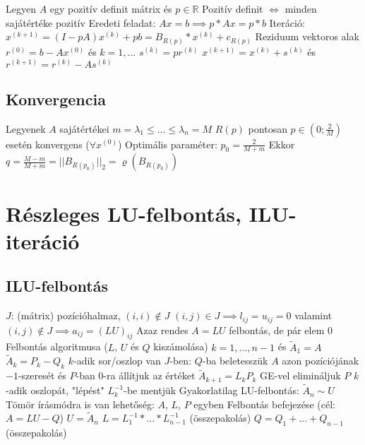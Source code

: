 \documentclass[12pt,a4paper]{article}
\begin{document}
\begin{outline}
	\1 Legyen $A$ egy pozitív definit mátrix és $p \in \mathbb{R}$
		\2 Pozitív definit $\Leftrightarrow$ minden sajátértéke pozitív
	\1 Eredeti feladat: $Ax=b \implies p*Ax = p*b$
	\1 Iteráció: $x^{(k+1)} = (I-pA) x^{(k)} + pb = B_{R(p)} * x^{(k)} + c_{R(p)}$
	\1 Reziduum vektoros alak
		\2 $r^{(0)} = b - Ax^{(0)}$ és $k=1,...$
		\2 $s^{(k)} = p r^{(k)}$
		\2 $x^{(k+1)} = x^{(k)} + s^{(k)}$ és $r^{(k+1)} = r^{(k)} - As^{(k)}$
\end{outline}

\subsection{Konvergencia}

\begin{outline}
	\1 Legyenek $A$ sajátértékei $m = \lambda_1 \le ... \le \lambda_n = M$
	\1 $R(p)$ pontosan $p \in (0; \frac{2}{M})$ esetén konvergens ($\forall x^{(0)}$)
	\1 Optimális paraméter: $p_0 = \frac{2}{M+m}$
		\2 Ekkor $q = \frac{M-m}{M+m} = ||B_{R(p_0)}||_2 = \varrho(B_{R(p_0)})$
\end{outline}

\pagebreak

\section{Részleges LU-felbontás, ILU-iteráció}

\subsection{ILU-felbontás}

\begin{outline}
	\1 $J$: (mátrix) pozícióhalmaz, $(i,i) \notin J$
	\1 $(i,j) \in J \implies l_{ij} = u_{ij} = 0$
	valamint $(i,j) \notin J \implies a_{ij} = (LU)_{ij}$
		\2 Azaz rendes $A=LU$ felbontás, de pár elem 0
	\1 Felbontás algoritmusa ($L$, $U$ és $Q$ kiszámolása)
		\2 $k=1,...,n-1$ és $\widetilde{A}_1 = A$
		\2 $\widetilde{A}_k = P_k - Q_k$
			\3 $k$-adik sor/oszlop van $J$-ben: $Q$-ba beletesszük $A$ azon pozíciójának $-1$-szeresét és $P$-ban 0-ra állítjuk az értéket
		\2 $\widetilde{A}_{k+1} = L_k P_k$
			\3 GE-vel elimináljuk $P$ $k$-adik oszlopát, "lépést" $L_k^{-1}$-be mentjük
			\3 Gyakorlatilag LU-felbontás: $\widetilde{A}_{n} \sim U$
			\3 Tömör írásmódra is van lehetőség: $A$, $L$, $P$ egyben
	\1 Felbontás befejezése (cél: $A = LU-Q$)
		\2 $U = \widetilde{A}_n$
		\2 $L = L_1^{-1} * ... * L_{n-1}^{-1}$ (összepakolás)
		\2 $Q = Q_1 + ... + Q_{n-1}$ (összepakolás)
\end{outline}
\end{document}
